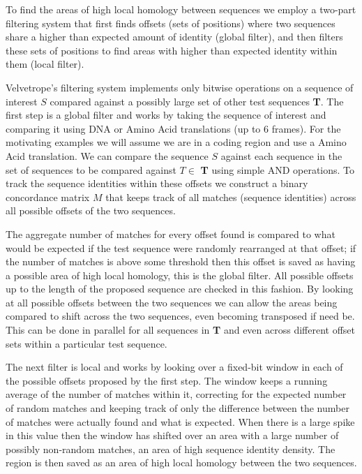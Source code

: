 \documentclass[phd,tocprelim]{cornell}
\begin{document}
To find the areas of high local homology between sequences we employ a two-part filtering system that first finds offsets (sets of positions) where two sequences share a higher than expected amount of identity (global filter), and then filters these sets of positions to find areas with higher than expected identity within them (local filter).

Velvetrope's filtering system implements only bitwise operations on a sequence of interest $S$ compared against a possibly large set of other test sequences \textbf{T}. The first step is a global filter and works by taking the sequence of interest and comparing it using DNA or Amino Acid translations (up to 6 frames). For the motivating examples we will assume we are in a coding region and use a Amino Acid translation. We can compare the sequence $S$ against each sequence in the set of sequences to be compared against $T \in$ \textbf{T}  using simple AND operations. To track the sequence identities within these offsets we construct a binary concordance matrix $M$ that keeps track of all matches (sequence identities) across all possible offsets of the two sequences.

The aggregate number of matches for every offset found is compared to what would be expected if the test sequence were randomly rearranged at that offset; if the number of matches is above some threshold then this offset is saved as having a possible area of high local homology, this is the global filter. All possible offsets up to the length of the proposed sequence are checked in this fashion. By looking at all possible offsets between the two sequences we can allow the areas being compared to shift across the two sequences, even becoming transposed if need be. This can be done in parallel for all sequences in \textbf{T} and even across different offset sets within a particular test sequence.

The next filter is local and works by looking over a fixed-bit window in each of the possible offsets proposed by the first step. The window keeps a running average of the number of matches within it, correcting for the expected number of random matches and keeping track of only the difference between the number of matches were actually found and what is expected. When there is a large spike in this value then the window has shifted over an area with a large number of possibly non-random matches, an area of high sequence identity density. The region is then saved as an area of high local homology between the two sequences.
\end{document}
